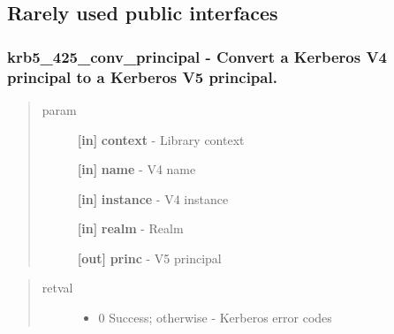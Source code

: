 \documentclass[letterpaper,10pt,english]{sphinxmanual}
\begin{document}
\subsection{Rarely used public interfaces}
\label{appdev/refs/api/index:rarely-used-public-interfaces}

\subsubsection{krb5\_425\_conv\_principal -  Convert a Kerberos V4 principal to a Kerberos V5 principal.}
\label{appdev/refs/api/krb5_425_conv_principal:krb5-425-conv-principal-convert-a-kerberos-v4-principal-to-a-kerberos-v5-principal}\label{appdev/refs/api/krb5_425_conv_principal::doc}

\begin{fulllineitems}
\label{appdev/refs/api/krb5_425_conv_principal:c.krb5_425_conv_principal}
\end{fulllineitems}

\begin{quote}\begin{description}
\item[{param}] \leavevmode
\textbf{{[}in{]}} \textbf{context} - Library context

\textbf{{[}in{]}} \textbf{name} - V4 name

\textbf{{[}in{]}} \textbf{instance} - V4 instance

\textbf{{[}in{]}} \textbf{realm} - Realm

\textbf{{[}out{]}} \textbf{princ} - V5 principal

\end{description}\end{quote}
\begin{quote}\begin{description}
\item[{retval}] \leavevmode\begin{itemize}
\item {} 
0   Success; otherwise - Kerberos error codes

\end{itemize}

\end{description}\end{quote}
\end{document}
